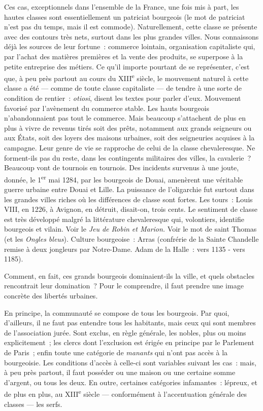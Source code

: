 \documentclass[french,twoside]{book} %
\begin{document}
Ces cas, exceptionnels dans l’ensemble de la France, une fois mis à part, les hautes classes sont essentiellement un patriciat bourgeois (le mot de patriciat n’est pas du temps, mais il est commode). Naturellement, cette classe se présente avec des contours très nets, surtout dans les plus grandes villes. Nous connaissons déjà les sources de leur fortune : commerce lointain, organisation capitaliste qui, par l’achat des matières premières et la vente des produits, se superpose à la petite entreprise des métiers. Ce qu’il importe pourtant de se représenter, c’est que, à peu près partout au cours du XIII\textsuperscript{e} siècle, le mouvement naturel à cette classe a été — comme de toute classe capitaliste — de tendre à une sorte de condition de rentier : {\itshape otiosi}, disent les textes pour parler d’eux. Mouvement favorisé par l’avènement du commerce stable. Les hauts bourgeois n’abandonnaient pas tout le commerce. Mais beaucoup s’attachent de plus en plus à vivre de revenus tirés soit des prêts, notamment aux grands seigneurs ou aux États, soit des loyers des maisons urbaines, soit des seigneuries acquises à la campagne. Leur genre de vie se rapproche de celui de la classe chevaleresque. Ne forment-ils pas du reste, dans les contingents militaires des villes, la cavalerie ? Beaucoup vont de tournois en tournois. Des incidents survenus à une joute, donnée, le 1\textsuperscript{er} mai 1284, par les bourgeois de Douai, amenèrent une véritable guerre urbaine entre Douai et Lille. La puissance de l’oligarchie fut surtout dans les grandes villes riches où les différences de classe sont fortes. Les tours : Louis VIII, en 1226, à Avignon, en détruit, disait-on, trois cents. Le sentiment  
\label{p75} de classe est très développé malgré la littérature chevaleresque qui, volontiers, identifie bourgeois et vilain. Voir le {\itshape Jeu de Robin et Marion.} Voir le mot de saint Thomas (et les {\itshape Ongles bleus}). Culture bourgeoise : Arras (confrérie de la Sainte Chandelle remise à deux jongleurs par Notre-Dame. Adam de la Halle : vers 1135 - vers 1185).\par
Comment, en fait, ces grands bourgeois dominaient-ils la ville, et quels obstacles rencontrait leur domination ? Pour le comprendre, il faut prendre une image concrète des libertés urbaines.\par
En principe, la communauté se compose de tous les bourgeois. Par quoi, d’ailleurs, il ne faut pas entendre tous les habitants, mais ceux qui sont membres de l’association jurée. Sont exclus, en règle générale, les nobles, plus ou moins explicitement ; les clercs dont l’exclusion est érigée en principe par le Parlement de Paris ; enfin toute une catégorie de \emph{manants} qui n’ont pas accès à la bourgeoisie. Les conditions d’accès à celle-ci sont variables suivant les cas : mais, à peu près partout, il faut posséder ou une maison ou une certaine somme d’argent, ou tous les deux. En outre, certaines catégories infamantes : lépreux, et de plus en plus, au XIII\textsuperscript{e} siècle — conformément à l’accentuation générale des classes — les serfs.\par
\end{document}
